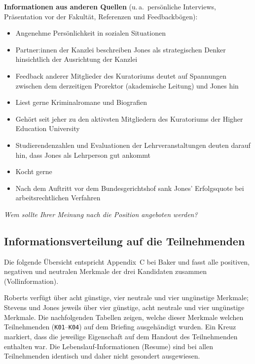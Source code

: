 \textbf{Informationen aus anderen Quellen}
(u.\,a.\ persönliche Interviews, Präsentation vor der Fakultät, Referenzen und Feedbackbögen):
\begin{itemize}
  \item Angenehme Persönlichkeit in sozialen Situationen
  \item Partner:innen der Kanzlei beschreiben Jones als strategischen Denker hinsichtlich der Ausrichtung
    der Kanzlei
  \item Feedback anderer Mitglieder des Kuratoriums deutet auf Spannungen zwischen dem derzeitigen Prorektor
    (akademische Leitung) und Jones hin
  \item Liest gerne Kriminalromane und Biografien
  \item Gehört seit jeher zu den aktivsten Mitgliedern des Kuratoriums der Higher Education
    University
  \item Studierendenzahlen und Evaluationen der Lehrveranstaltungen deuten darauf hin, dass Jones als
    Lehrperson gut ankommt
  \item Kocht gerne
  \item Nach dem Auftritt vor dem Bundesgerichtshof sank Jones' Erfolgsquote bei arbeitsrechtlichen Verfahren
\end{itemize}

\vspace{1em}
\noindent\textit{Wem sollte Ihrer Meinung nach die Position angeboten werden?}
\underline{\hspace{6cm}}

\clearpage
\pagestyle{TUDa}
\thispagestyle{TUDa}

\subsection*{Informationsverteilung auf die Teilnehmenden}
\label{annex:hidden-profile-information-distribution}

Die folgende Übersicht entspricht Appendix~C bei Baker
\cite{bakerEnhancingGroupDecision2010} und fasst alle positiven, negativen und neutralen Merkmale der
drei Kandidaten zusammen (Vollinformation).

Roberts verfügt über acht günstige, vier neutrale und vier ungünstige Merkmale; Stevens und Jones
jeweils über vier günstige, acht neutrale und vier ungünstige Merkmale.
Die nachfolgenden Tabellen zeigen, welche dieser Merkmale welchen Teilnehmenden (\texttt{K01}--\texttt{K04})
auf dem Briefing ausgehändigt wurden.
Ein Kreuz markiert, dass die jeweilige Eigenschaft auf dem Handout des Teilnehmenden enthalten war.
Die Lebenslauf-Informationen (Resume) sind bei allen Teilnehmenden identisch und daher nicht
gesondert ausgewiesen.

